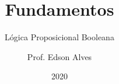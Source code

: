 \title{Fundamentos}
\subtitle{Lógica Proposicional Booleana}
\date{2020}
\author{Prof. Edson Alves}
